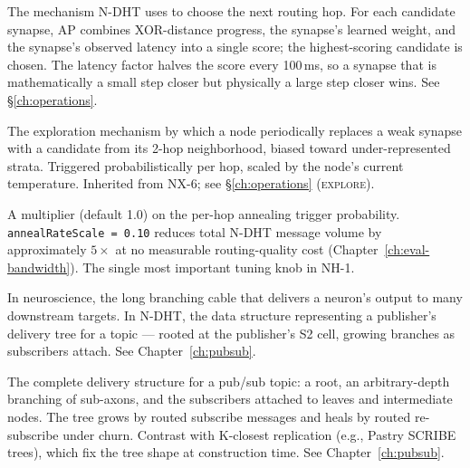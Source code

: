 \documentclass[twoside,nobib]{tufte-book}
\newcommand{\NDHT}{N-DHT\xspace}
\begin{document}
\begin{description}\setlength\itemsep{0.45em}

\item[\textsc{action potential (AP) scoring}]
The mechanism \NDHT uses to choose the next routing hop. For each
candidate synapse, AP combines XOR-distance progress, the
synapse's learned weight, and the synapse's observed latency into
a single score; the highest-scoring candidate is chosen. The
latency factor halves the score every 100\,ms, so a synapse that
is mathematically a small step closer but physically a large step
closer wins. See \S\ref{ch:operations}.

\item[\textsc{annealing}]
The exploration mechanism by which a node periodically replaces a
weak synapse with a candidate from its 2-hop neighborhood, biased
toward under-represented strata. Triggered probabilistically per
hop, scaled by the node's current temperature. Inherited from NX-6;
see \S\ref{ch:operations} (\textsc{explore}).

\item[\textsc{annealRateScale}]
A multiplier (default 1.0) on the per-hop annealing trigger
probability. \texttt{annealRateScale = 0.10} reduces total
\NDHT message volume by approximately $5\times$ at no measurable
routing-quality cost (Chapter~\ref{ch:eval-bandwidth}). The
single most important tuning knob in NH-1.

\item[\textsc{axon}]
In neuroscience, the long branching cable that delivers a neuron's
output to many downstream targets. In \NDHT, the data structure
representing a publisher's delivery tree for a topic --- rooted at
the publisher's S2 cell, growing branches as subscribers attach.
See Chapter~\ref{ch:pubsub}.

\item[\textsc{axonal tree}]
The complete delivery structure for a pub/sub topic: a root, an
arbitrary-depth branching of sub-axons, and the subscribers
attached to leaves and intermediate nodes. The tree grows by
routed subscribe messages and heals by routed re-subscribe under
churn. Contrast with K-closest replication (e.g., Pastry SCRIBE
trees), which fix the tree shape at construction time. See
Chapter~\ref{ch:pubsub}.


\end{description}
\end{document}
